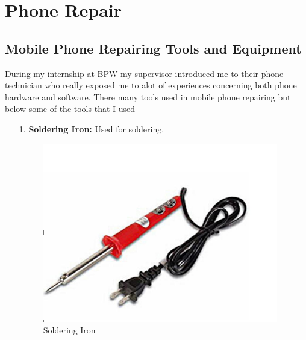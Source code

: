 \section{Phone Repair}

\subsection{Mobile Phone Repairing Tools and Equipment}
During my internship at BPW my supervisor introduced me to their phone technician who really exposed me to alot of experiences concerning both phone hardware and software.
There many tools used in mobile phone repairing but below some of the tools that I used\cite{phone}


\begin{itemize}
\item[1.] \textbf{Soldering Iron:} Used for soldering.
\begin{figure}[h!]
\begin{raggedright}
	\includegraphics[scale=0.5]{img/solder.PNG}
	\caption{Soldering Iron}
	\label{fig:symbols}
\end{raggedright}
\end{figure}


\end{itemize}
